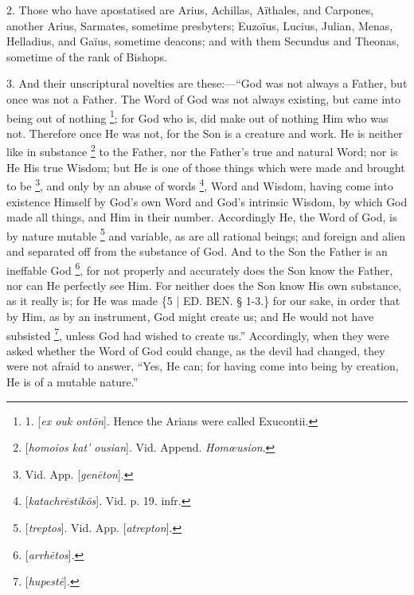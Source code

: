 2. Those who
have apostatised are Arius, Achillas, Aïthales, and Carpones, another
Arius, Sarmates, sometime presbyters; Euzoïus, Lucius, Julian, Menas,
Helladius, and Gaïus, sometime deacons; and with them Secundus and
Theonas, sometime of the rank of Bishops.

3.
And their unscriptural novelties are these:—``God was not always a
Father, but once was not a Father. The Word of God was not always
existing, but came into being out of nothing \footnote{

1. [\emph{ex ouk
ont\={o}n}]. Hence the Arians were called Exucontii.}; for God who is, did make out of nothing Him who was not.
Therefore once He was not, for the Son is a creature and work. He is
neither like in substance \footnote{[\emph{homoios kat' ousian}]. Vid. Append. \emph{Homœusion}.}
to the Father, nor the Father's true and natural Word; nor is He His
true Wisdom; but He is one of those things which were made and brought
to be \footnote{Vid. App. [\emph{gen\={e}ton}].}, and only by an
abuse of words \footnote{[\emph{katachr\={e}stik\={o}s}]. Vid. p. 19. infr.}, Word and
Wisdom, having come into existence Himself by God's own Word and God's
intrinsic Wisdom, by which God made all things, and Him in their
number. Accordingly He, the Word of God, is by nature mutable \footnote{[\emph{treptos}]. Vid. App. [\emph{atrepton}].} and variable, as are all rational beings; and foreign and alien
and separated off from the substance of God. And to the Son the Father
is an ineffable God \footnote{[\emph{arrh\={e}tos}].}, for
not properly and accurately does the Son know the Father, nor can He
perfectly see Him. For neither does the Son know His own substance, as
it really is; for He was made \{5 | ED.
BEN. § 1-3.\} for our sake, in order that by
Him, as by an instrument, God might create us; and He would not have
subsisted \footnote{[\emph{hupest\={e}}].}, unless God had
wished to create us.'' Accordingly, when they were asked whether the
Word of God could change, as the devil had changed, they were not
afraid to answer, ``Yes, He can; for having come into being by
creation, He is of a mutable nature.''

